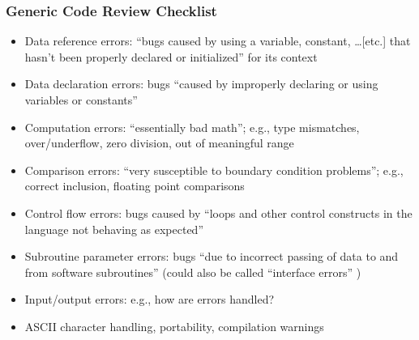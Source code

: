 \subsubsection{Generic Code Review Checklist \cite[p.~99-103]{patton_software_2006}}

\begin{itemize}
      \item Data reference errors: ``bugs caused by using a variable, constant,
            \dots [etc.] that hasn't been properly declared or initialized''
            for its context \cite[p.~99]{patton_software_2006}
      \item Data declaration errors: bugs ``caused by improperly declaring
            or using variables or constants'' \cite[p.~100]{patton_software_2006}
      \item Computation errors: ``essentially bad math''; e.g., type mismatches,
            over/underflow, zero division, out of meaningful range
            \cite[p.~101]{patton_software_2006}
            \label{comp-errors}
      \item Comparison errors: ``very susceptible to boundary condition
            problems''; e.g., correct inclusion, floating point comparisons
            \cite[p.~101]{patton_software_2006}
      \item Control flow errors: bugs caused by ``loops and other control
            constructs in the language not behaving as expected''
            \cite[p.~102]{patton_software_2006}
      \item Subroutine parameter errors: bugs ``due to incorrect passing of data
            to and from software subroutines'' \cite[p.~102]{patton_software_2006}
            (could also be called ``interface errors''
            \cite[p.~416]{van_vliet_software_2000})
      \item Input/output errors: e.g., how are errors handled?
            \cite[p.~102-103]{patton_software_2006}
      \item ASCII character handling, portability, compilation warnings
            \cite[p.~103]{patton_software_2006}
\end{itemize}

